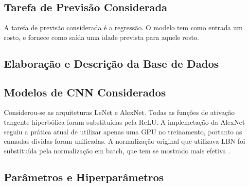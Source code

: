 
\subsection{Tarefa de Previsão Considerada}
A tarefa de previsão considerada é a regressão. O modelo tem como entrada um rosto, e fornece como saída uma idade prevista para aquele rosto.

\subsection{Elaboração e Descrição da Base de Dados}


\subsection{Modelos de CNN Considerados}
Considerou-se as arquiteturas LeNet e AlexNet. Todas as funções de ativação tangente hiperbólica foram substituídas pela ReLU. A implemetação da AlexNet seguiu a prática atual de utilizar apenas uma GPU no treinamento, portanto as camadas dividas foram unificadas. A normalização original que utilizava LBN foi substituída pela normalização em batch, que tem se mostrado mais efetiva .

\subsection{Parâmetros e Hiperparâmetros}

